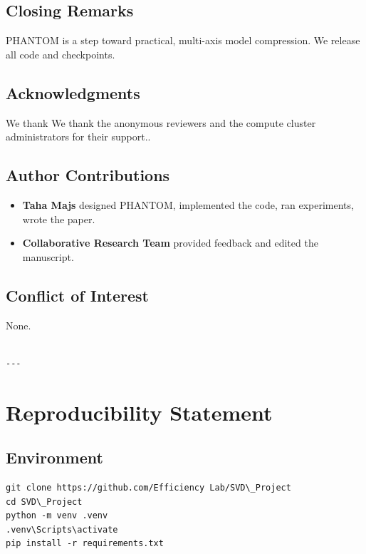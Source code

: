 \subsection{Closing Remarks}

PHANTOM is a step toward practical, multi-axis model compression. We release 
all code and checkpoints.

\subsection{Acknowledgments}

We thank We thank the anonymous reviewers and the compute cluster administrators for their support..

\subsection{Author Contributions}

\begin{itemize}
\item \textbf{Taha Majs} designed PHANTOM, implemented the code, ran experiments,
  wrote the paper.
\item \textbf{Collaborative Research Team} provided feedback and edited the manuscript.

\end{itemize}
\subsection{Conflict of Interest}

None.
\begin{lstlisting}

---
\end{lstlisting}


\section{Reproducibility Statement}

\subsection{Environment}

\begin{lstlisting}
git clone https://github.com/Efficiency Lab/SVD\_Project
cd SVD\_Project
python -m venv .venv
.venv\Scripts\activate
pip install -r requirements.txt
\end{lstlisting}

